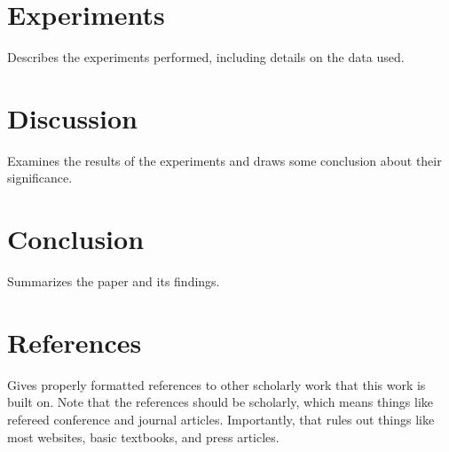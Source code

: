 \documentclass[letterpaper, 10pt,DIV=13]{scrartcl}
\numberwithin{equation}{section} %
\numberwithin{figure}{section} %
\numberwithin{table}{section} %
\begin{document}
\section*{Experiments}
\begin{spacing}{1.25}
Describes the experiments performed, including details on the data used.
\end{spacing}

\section*{Discussion}
\begin{spacing}{1.25}
Examines the results of the experiments and draws some conclusion about their significance.
\end{spacing}

\section*{Conclusion}
\begin{spacing}{1.25}
Summarizes the paper and its findings.
\end{spacing}

\section*{References}
\begin{spacing}{1.25}
Gives properly formatted references to other scholarly work that this work is built on. Note that the references should be scholarly, which means things like refereed conference and journal articles. Importantly, that rules out things like most websites, basic textbooks, and press articles.
\end{spacing}
\end{document}
